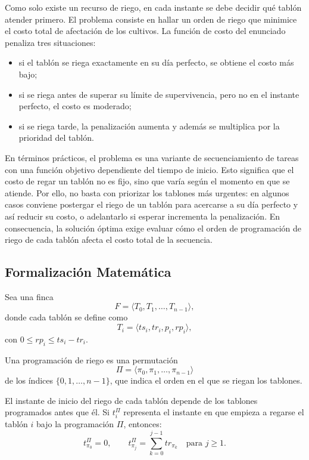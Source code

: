 \documentclass[12pt,a4paper]{article}
\begin{document}
Como solo existe un recurso de riego, en cada instante se debe decidir qu\'e tabl\'on atender primero. El problema consiste en hallar un orden de riego que minimice el costo total de afectaci\'on de los cultivos. La funci\'on de costo del enunciado penaliza tres situaciones:

\begin{itemize}
  \item si el tabl\'on se riega exactamente en su d\'ia perfecto, se obtiene el costo m\'as bajo;
  \item si se riega antes de superar su l\'imite de supervivencia, pero no en el instante perfecto, el costo es moderado;
  \item si se riega tarde, la penalizaci\'on aumenta y adem\'as se multiplica por la prioridad del tabl\'on.
\end{itemize}

En t\'erminos pr\'acticos, el problema es una variante de secuenciamiento de tareas con una funci\'on objetivo dependiente del tiempo de inicio. Esto significa que el costo de regar un tabl\'on no es fijo, sino que var\'ia seg\'un el momento en que se atiende. Por ello, no basta con priorizar los tablones m\'as urgentes: en algunos casos conviene postergar el riego de un tabl\'on para acercarse a su d\'ia perfecto y as\'i reducir su costo, o adelantarlo si esperar incrementa la penalización. En consecuencia, la soluci\'on \'optima exige evaluar c\'omo el orden de programaci\'on de riego de cada tabl\'on afecta el costo total de la secuencia.
\subsection{Formalizaci\'on Matem\'atica}

Sea una finca
\[
F = \langle T_0, T_1, \dots, T_{n-1} \rangle,
\]
donde cada tabl\'on se define como
\[
T_i = \langle ts_i, tr_i, p_i, rp_i \rangle,
\]
con \(0 \leq rp_i \leq ts_i - tr_i\).

Una programaci\'on de riego es una permutaci\'on
\[
\Pi = \langle \pi_0, \pi_1, \dots, \pi_{n-1} \rangle
\]
de los \'indices \(\{0,1,\dots,n-1\}\), que indica el orden en el que se riegan los tablones.

El instante de inicio del riego de cada tabl\'on depende de los tablones programados antes que \'el. Si \(t_i^\Pi\) representa el instante en que empieza a regarse el tabl\'on \(i\) bajo la programaci\'on \(\Pi\), entonces:
\[
t_{\pi_0}^{\Pi} = 0,
\qquad
t_{\pi_j}^{\Pi} = \sum_{k=0}^{j-1} tr_{\pi_k}
\quad \text{para } j \geq 1.
\]
\end{document}
